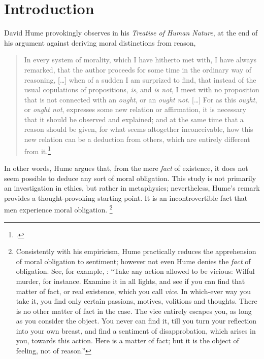 
\chapter{Introduction}\label{chap:intro}

David Hume provokingly observes in his \emph{Treatise of Human Nature}, at the end of his argument against deriving moral distinctions from reason,
%
\begin{quotation}
In every system of morality, which I have hitherto met with, I have always remarked, that the author proceeds for some time in the ordinary way of reasoning, [\ldots] when of a sudden I am surprized to find, that instead of the usual copulations of propositions, \emph{is}, and \emph{is not}, I meet with no proposition that is not connected with an \emph{ought}, or an \emph{ought not}. [\ldots] For as this \emph{ought}, or \emph{ought not}, expresses some new relation or affirmation, it is necessary that it should be observed and explained; and at the same time that a reason should be given, for what seems altogether inconceivable, how this new relation can be a deduction from others, which are entirely different from it.\footcite[Bk.~III, sec.~i, 521]{hume:treatise}
\end{quotation}
%
In other words, Hume argues that, from the mere \emph{fact} of existence, it does not seem possible to deduce any sort of moral obligation. This study is not primarily an investigation in ethics, but rather in metaphysics; nevertheless, Hume’s remark provides a thought-provoking starting point. It is an incontrovertible fact that men experience moral obligation.%
%
\footnote{Consistently with his empiricism, Hume practically reduces the apprehension of moral obligation to sentiment; however not even Hume denies the \emph{fact} of obligation. See, for example, \cite[Bk.~III, sec.~i, 520]{hume:treatise}: “Take any action allowed to be vicious: Wilful murder, for instance. Examine it in all lights, and see if you can find that matter of fact, or real existence, which you call \emph{vice}. In which-ever way you take it, you find only certain passions, motives, volitions and thoughts. There is no other matter of fact in the case. The vice entirely escapes you, as long as you consider the object. You never can find it, till you turn your reflection into your own breast, and find a sentiment of disapprobation, which arises in you, towards this action. Here is a matter of fact; but it is the object of feeling, not of reason.”}
